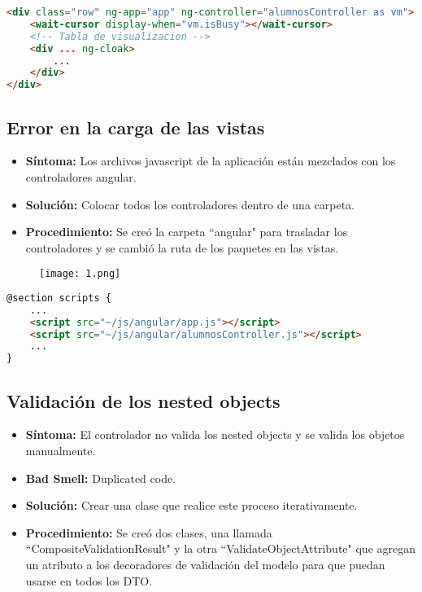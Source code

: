 \begin{lstlisting}[language=html]
<div class="row" ng-app="app" ng-controller="alumnosController as vm">
	<wait-cursor display-when="vm.isBusy"></wait-cursor>
	<!-- Tabla de visualizacion -->
	<div ... ng-cloak>
		...
	</div>
</div>
\end{lstlisting}

\subsection{Error en la carga de las vistas}
\begin{itemize}
	\item \textbf{Síntoma:} Los archivos javascript de la aplicación están mezclados con los controladores angular.
	\item \textbf{Solución:} Colocar todos los controladores dentro de una carpeta.
	\item \textbf{Procedimiento:} Se creó la carpeta ``angular" para trasladar los controladores y se cambió la ruta de los paquetes en las vistas.
\end{itemize}

\begin{figure}[h]
	\texttt{[image: 1.png]}
	\centering
\end{figure}

\begin{lstlisting}[language=html]
@section scripts {
	...
	<script src="~/js/angular/app.js"></script>
	<script src="~/js/angular/alumnosController.js"></script>
	...
}
\end{lstlisting}

\subsection{Validación de los nested objects}
\begin{itemize}
	\item \textbf{Síntoma:} El controlador no valida los nested objects y se valida los objetos manualmente.
	\item \textbf{Bad Smell:} Duplicated code.
	\item \textbf{Solución:} Crear una clase que realice este proceso iterativamente.
	\item \textbf{Procedimiento:} Se creó dos clases, una llamada ``CompositeValidationResult" y la otra ``ValidateObjectAttribute" que agregan un atributo a los decoradores de validación del modelo para que puedan usarse en todos los DTO.
\end{itemize}

